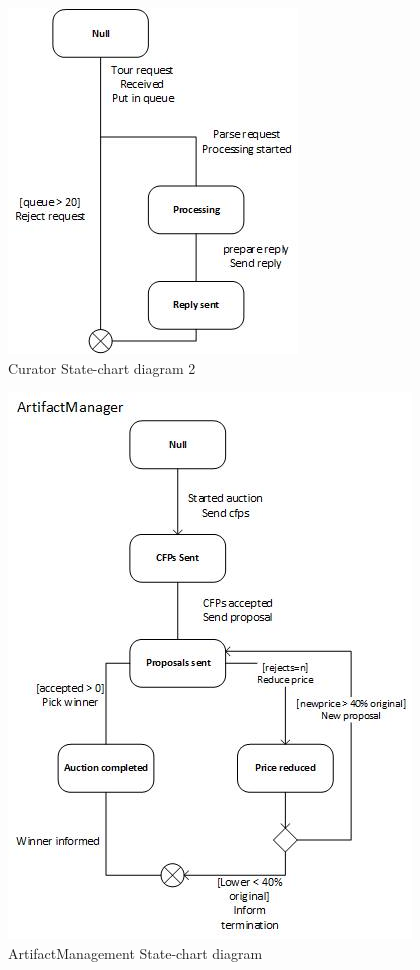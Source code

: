 \documentclass[a4paper, 11pt]{article}
\begin{document}
\begin{figure}[H]
	\caption{Curator State-chart diagram 2}
	\centering
	\includegraphics[scale=0.9]{./images/curator2UML.jpg}
\end{figure}
\begin{figure}[H]
	\caption{ArtifactManagement State-chart diagram}
	\centering
	\includegraphics[scale=0.9]{./images/artifactmanagerUML.jpg}
\end{figure}
\end{document}
